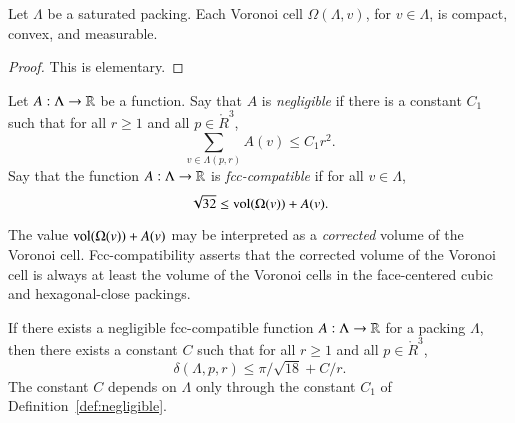 \begin{lemma}
Let $\Lambda$ be a saturated packing.
Each Voronoi cell $\Omega(\Lambda,v)$, for $v\in\Lambda$, is
compact, convex, and measurable.
\end{lemma}

\begin{proof}  This is elementary.
\end{proof}

\begin{definition}[negligible]\label{def:negligible}
Let $A:\Lambda\to{\mathbb R}$ be a function.  Say that $A$
is {\it negligible\/}
if there is a constant $C_1$ such that for all $r\ge1$ and all
$p\in\ring{R}^3$,
   $$\sum_{v\in\Lambda(p,r)} A(v) \le C_1 r^2.$$
Say that the function $A:\Lambda\to{\mathbb R}$ is
  {\it fcc-compatible\/}
if for all $v\in\Lambda$, 
$$\sqrt{32}\le {\operatorname{vol}}(\Omega(v)) + A(v).$$
\end{definition}





\begin{remark}
The value ${\operatorname{vol}}(\Omega(v)) + A(v)$ may be interpreted as a
{\it corrected\/} volume of the Voronoi
cell. Fcc-compatibility asserts that the corrected volume of the
Voronoi cell is always at least the volume of the Voronoi cells in
the face-centered cubic and hexagonal-close packings.
\end{remark}



\begin{lemma}
\label{lemma:deltabound} If there exists a 
negligible  fcc-compatible function
$A:\Lambda\to{\mathbb R}$ for a 
packing $\Lambda$, then there
exists a constant $C$ such that for all $r\ge1$ and all
$p\in\ring{R}^3$,
    $$
    \delta(\Lambda,p,r)
    \le \pi/\sqrt{18} + C/r.
    $$
The constant $C$ depends on $\Lambda$ only through the constant
$C_1$ of Definition~\ref{def:negligible}.
\end{lemma}



